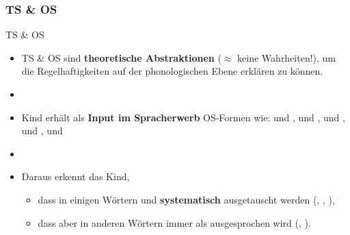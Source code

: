 %
\subsubsection{TS \& OS}
%

\begin{frame}{TS \& OS}

\begin{itemize}
	\item TS \& OS sind \textbf{theoretische Abstraktionen} ($\approx$ keine Wahrheiten!), um die Regelhaftigkeiten auf der phonologischen Ebene erklären zu können.
	\item[]
	\item Kind erhält als \textbf{Input im Spracherwerb} OS-Formen wie: \textipa{[\textscr a: t]} und \textipa{[\textscr E: t @]}, \textipa{[\textscr a: t]} und \textipa{[\textscr E: d 5]}, \textipa{[b E t]} und \textipa{[b E t @ n]}, \textipa{[b a: t]} und \textipa{[b E: d 5]}, \textipa{[k I n t]} und \textipa{[k I n d 5]}
	\item[]
	\item Daraus erkennt das Kind,

	\begin{itemize}
		\item dass in einigen Wörtern \textipa{[d]} und \textipa{[t]} \textbf{systematisch} ausgetauscht werden (\zB {}, , ),
		\item dass aber in anderen Wörtern \textipa{[t]} immer als \textipa{[t]} ausgesprochen wird  (\zB {}, ).
	\end{itemize}
		
\end{itemize}

\end{frame}




